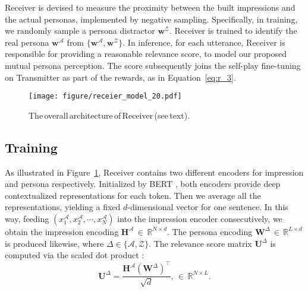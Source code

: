 \documentclass[11pt,a4paper]{article}
\begin{document}
Receiver is devised to measure the proximity between the built impressions and the actual personas, implemented by negative sampling. Specifically, in training, we randomly sample a persona distractor $\mathbf{w}^{\mathcal{Z}}$. Receiver is trained to identify the real persona $\mathbf{w}^\mathcal{A}$ from $\{\mathbf{w}^\mathcal{A}, \mathbf{w}^\mathcal{Z}\}$. In inference, for each utterance, Receiver is responsible for providing a reasonable relevance score, to model our proposed mutual persona perception. The score subsequently joins the self-play fine-tuning on Transmitter as part of the rewards, as in Equation~\ref{eq:r_3}.

\begin{figure}[t]
    \centering
    \texttt{[image: figure/receier\_model\_20.pdf]}
    \caption{The\,overall\,architecture\,of\,Receiver\,(see\,text).}
    \label{fig:receiver_model}
\end{figure}

\subsection{Training}

As illustrated in Figure~\ref{fig:receiver_model}, Receiver contains two different encoders for impression and persona respectively. Initialized by BERT \cite{devlin2018bert}, both encoders provide deep contextualized representations for each token. Then we average all the representations, yielding a fixed $d$-dimensional vector for one sentence. In this way, feeding $(x^{\mathcal{A}}_{1},x^{\mathcal{A}}_{2},\cdots, x^{\mathcal{A}}_{N})$ into the impression encoder consecutively, we obtain the impression encoding $\mathbf{H}^{\mathcal{A}}\,{\in}\,\mathbb{R}^{N \times d}$. The persona encoding $\mathbf{W}^{\Delta}\,{\in}\,\mathbb{R}^{L \times d}$ is produced likewise, where $\Delta\in\!\{\mathcal{A},\mathcal{Z}\}\!$. The relevance score matrix $\mathbf{U}^{\Delta}$ is computed via the scaled dot product \cite{vaswani2017attention}:
\begin{equation}
    \mathbf{U}^{\Delta} = \frac{\mathbf{H}^\mathcal{A} ({\mathbf{W}^\Delta})^\top}{\sqrt{d}}, \,\in\,\mathbb{R}^{N{\times}L}.
\end{equation}
\end{document}
